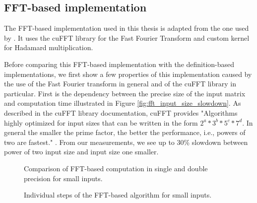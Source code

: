 \subsection{FFT-based implementation}
\label{sec:results_fft_based}

The FFT-based implementation used in this thesis is adapted from the one used by \citet{misko}. It uses the cuFFT library for the Fast Fourier Transform and custom kernel for Hadamard multiplication. 

Before comparing this FFT-based implementation with the definition-based implementations, we first show a few properties of this implementation caused by the use of the Fast Fourier transform in general and of the cuFFT library in particular. First is the dependency between the precise size of the input matrix and computation time illustrated in Figure \ref{fig:fft_input_size_slowdown}. As described in the cuFFT library documentation, cuFFT provides "Algorithms highly optimized for input sizes that can be written in the form $2^{a}*3^{b}*5^{c}*7^{d}$. In general the smaller the prime factor, the better the performance, i.e., powers of two are fastest." \citep{site:cufft}. From our measurements, we see up to 30\% %
slowdown between power of two input size and input size one smaller. 


\begin{figure}[ht]
	\centering
	\def\svgwidth{0.5\textwidth}
	
	\caption{Comparison of FFT-based computation in single and double precision for small inputs.}
	\label{fig:fft_double_faster_compute_time}
\end{figure}

\begin{figure}[ht]
	\centering
	\def\svgwidth{\textwidth}
	
	\caption{Individual steps of the FFT-based algorithm for small inputs.}
	\label{fig:fft_double_faster_steps}
\end{figure}


